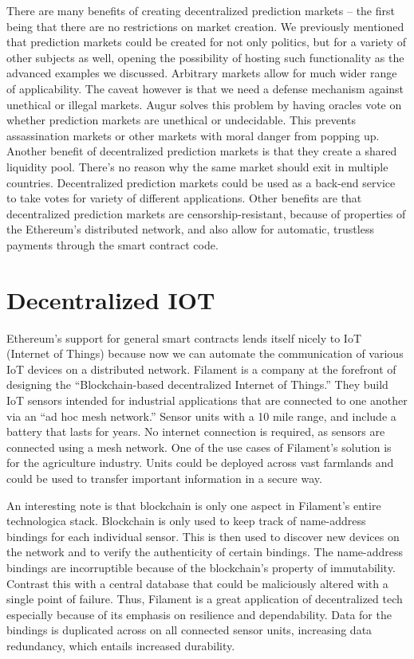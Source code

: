 \documentclass[full.tex]{subfiles}
\begin{document}
    There are many benefits of creating decentralized prediction markets -- the first being that there are no restrictions on market creation. We previously mentioned that prediction markets could be created for not only politics, but for a variety of other subjects as well, opening the possibility of hosting such functionality as the advanced examples we discussed. Arbitrary markets allow for much wider range of applicability. The caveat however is that we need a defense mechanism against unethical or illegal markets. Augur solves this problem by having oracles vote on whether prediction markets are unethical or undecidable. This prevents assassination markets or other markets with moral danger from popping up. Another benefit of decentralized prediction markets is that they create a shared liquidity pool. There's no reason why the same market should exit in multiple countries. Decentralized prediction markets could be used as a back-end service to take votes for variety of different applications. Other benefits are that decentralized prediction markets are censorship-resistant, because of properties of the Ethereum's distributed network, and also allow for automatic, trustless payments through the smart contract code.
    
    \section*{Decentralized IOT}
    
    Ethereum's support for general smart contracts lends itself nicely to IoT (Internet of Things) because now we can automate the communication of various IoT devices on a distributed network. Filament is a company at the forefront of designing the ``Blockchain-based decentralized Internet of Things.'' They build IoT sensors intended for industrial applications that are connected to one another via an ``ad hoc mesh network.'' Sensor units with a 10 mile range, and include a battery that lasts for years. No internet connection is required, as sensors are connected using a mesh network. One of the use cases of Filament's solution is for the agriculture industry. Units could be deployed across vast farmlands and could be used to transfer important information in a secure way.
    
    An interesting note is that blockchain is only one aspect in Filament's entire technologica stack. Blockchain is only used to keep track of name-address bindings for each individual sensor. This is then used to discover new devices on the network and to verify the authenticity of certain bindings. The name-address bindings are incorruptible because of the blockchain's property of immutability. Contrast this with a central database that could be maliciously altered with a single point of failure. Thus, Filament is a great application of decentralized tech especially because of its emphasis on resilience and dependability. Data for the bindings is duplicated across on all connected sensor units, increasing data redundancy, which entails increased durability.
    
\end{document}

